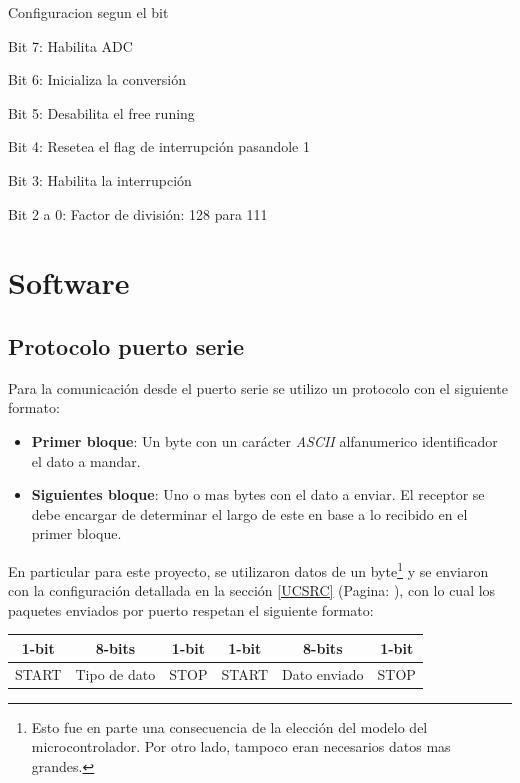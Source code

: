 \documentclass[10pt,spanish,a4paper,openany,notitlepage]{article}
\begin{document}
\begin{description}
\item{Configuracion segun el bit}
\item{Bit 7}: Habilita ADC
\item{Bit 6}: Inicializa la conversión
\item{Bit 5}: Desabilita el free runing
\item{Bit 4}: Resetea el flag de interrupción pasandole 1
\item{Bit 3}: Habilita la interrupción
\item{Bit 2 a 0}: Factor de división: 128 para 111
\end{description}

\section{Software}

\subsection{Protocolo puerto serie}
Para la comunicación desde el puerto serie se utilizo un protocolo con el siguiente formato:

\begin{itemize}
\item \textbf{Primer bloque}: Un byte con un carácter \textit{ASCII} alfanumerico identificador el dato a mandar.
\item \textbf{Siguientes bloque}: Uno o mas bytes con el dato a enviar. El receptor se debe encargar de determinar el largo de este en base a lo recibido en el primer bloque.
\end{itemize}

En particular para este proyecto, se utilizaron datos de un byte\footnote{Esto fue en parte una consecuencia de la elección del modelo del microcontrolador. Por otro lado, tampoco eran necesarios datos mas grandes.} y se enviaron con la configuración detallada en la sección \ref{UCSRC} (Pagina: \pageref{UCSRC}), con lo cual los paquetes enviados por puerto respetan el siguiente formato:

\begin{center}
\begin{tabular}{|c|c|c|c|c|c|}\hline
1-bit&8-bits&1-bit&1-bit&8-bits&1-bit\\\hline
START&Tipo de dato&STOP&START&Dato enviado&STOP\\\hline
\end{tabular}
\end{center}
\end{document}

